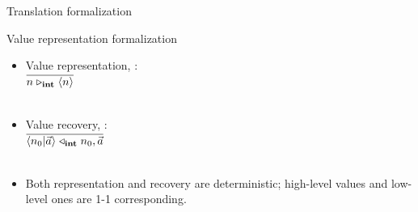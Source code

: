 \documentclass{beamer}
\newtheorem{thm}{Theorem}
\begin{document}
\begin{frame}{Translation formalization}
\begin{itemize}
\end{itemize}
\end{frame}


\begin{frame}{Value representation formalization}
\begin{itemize}
	\item Value representation,  : \\[2ex]
	$\overline{n \mathrel{\triangleright_{\mathbf{int}}} \langle n \rangle}$ \\[2ex]
	\\[2ex]
	
	\item Value recovery,  : \\[2ex]
	
	$\ol{\Vtransb{\etail{n_0}{\a}}{\int}{n_0}{\a}}$ \\[3ex] 
\\

\item Both representation and recovery are deterministic; high-level values and low-level ones are 1-1 corresponding. 

\end{itemize}

\end{frame}
 
\end{document}
